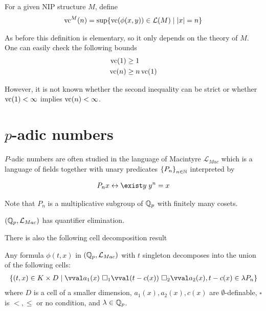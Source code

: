 \documentclass{amsart}
\renewcommand{\LL}{\mathcal L}
\newcommand{\LLM}{\mathcal L_{Mac}}
\newcommand{\curly}[1]{\left\{#1\right\}}
\begin{document}
\begin{Definition}
  For a given NIP structure $M$, define 
  \begin{align*}
    \vc^M(n) = \sup \{\vc(\phi(x, y)) \in \LL(M) \mid |x| = n\}
  \end{align*}
\end{Definition}

As before this definition is elementary, so it only depends on the theory of $M$.
One can easily check the following bounds
\begin{align*}
  \operatorname{vc}(1) &\geq 1 \\
  \operatorname{vc}(n) &\geq n\operatorname{vc}(1)
\end{align*}

However, it is not known whether the second inequality can be strict or whether $\operatorname{vc}(1) < \infty$ implies $\operatorname{vc}(n) < \infty$.


\section{$p$-adic numbers}


$P$-adic numbers are often studied in the language of Macintyre $\LLM$%
which is a language of fields together with unary predicates $\curly{P_n}_{n \in \N}$ interpreted by

\begin{align*}
  P_n x \leftrightarrow \exist y \; y^n = x
\end{align*}  

Note that $P_n$ is a multiplicative subgroup of $\mathbb{Q}_p$ with finitely many cosets.

\begin{Theorem}
  $(\Q_p, \LLM)$ has quantifier elimination.
\end{Theorem}

There is also the following cell decomposition result

\begin{Theorem}
  Any formula $\phi(t, x)$ in $(\Q_p, \LLM)$ with $t$ singleton decomposes into the union of the following cells:
  \begin{align*}
          \curly{(t, x) \in K \times D \mid \vval a_1(x) \ \square_1 \vval (t - c(x)) \ \square_2 \vval a_2(x), t - c(x) \in \lambda P_n}
  \end{align*}
  where $D$ is a cell of a smaller dimension,
  $a_1(x), a_2(x), c(x)$ are $\emptyset$-definable,
  $\square$ is $<, \leq$ or no condition, and
  $\lambda  \in\mathbb{Q}_p$.    
\end{Theorem}  
\end{document}
